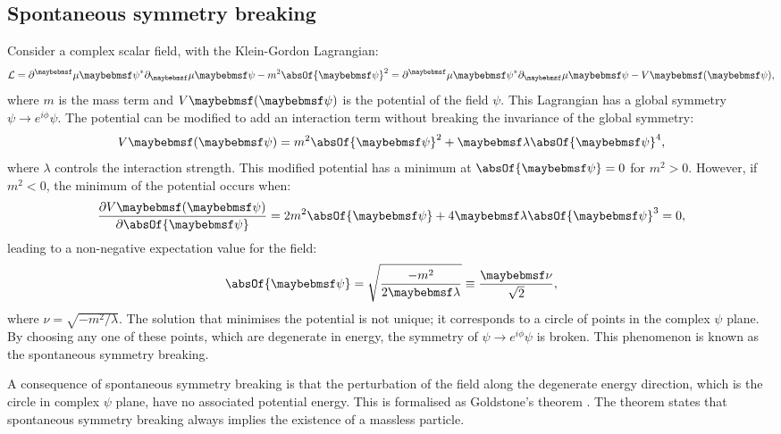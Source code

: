 
\subsection{Spontaneous symmetry breaking}

Consider a complex scalar field, with the Klein-Gordon Lagrangian:
\begin{equation}
\Lagr = \partial^\mu{\psi}^*\partial_\mu\psi - m^2 \absOf{\psi}^2 =  \partial^\mu{\psi}^*\partial_\mu\psi - V\parenths{\psi} ,
\label{eq:theoryKGLagrangian}
\end{equation}
where $m$ is the mass term and $V\parenths{\psi} $ is the potential of the field $\psi$. This Lagrangian has a global symmetry $\psi \to e^{i\phi}\psi$. The potential can be modified to add an interaction term without breaking the  invariance of the global symmetry:
\begin{equation}
V\parenths{\psi} =  m^2 \absOf{\psi}^2 + \lambda\absOf{\psi}^4,
\end{equation}
where $\lambda$ controls the interaction strength. This modified potential has a minimum at $ \absOf{\psi}=0$ for $m^2>0$. However, if $m^2<0$, the minimum of the potential occurs when:
\begin{equation}
\frac{\partial{V}\parenths{\psi}}{\partial{\absOf{\psi}}} =  2 m^2 \absOf{\psi} + 4\lambda\absOf{\psi}^3 = 0,
\end{equation}
leading to a non-negative expectation value for the field:
\begin{equation}
\absOf{\psi} = \sqrt{\frac{-m^2}{2\lambda}}\equiv \frac{\nu}{\sqrt{2}},
\end{equation}
where $\nu = \sqrt{-m^2/\lambda}$. The solution that minimises the potential is not unique; it corresponds to a circle of points in the complex $\psi$ plane. By choosing any one of these points, which are degenerate in energy, the symmetry of   $\psi \to e^{i\phi}\psi$ is broken. This phenomenon is known as the spontaneous symmetry breaking.

A consequence of  spontaneous symmetry breaking is that the perturbation of the field along the degenerate energy direction, which is the circle in complex $\psi$ plane, have no associated potential energy. This is formalised as Goldstone's theorem \cite{Nambu:1960tm,Goldstone:1961eq}. The theorem states that spontaneous symmetry breaking always implies the existence of a massless particle.

